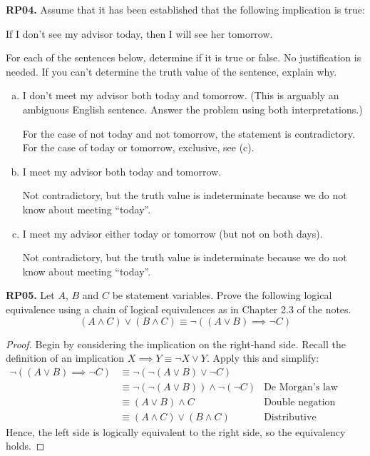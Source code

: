 \documentclass[11pt]{article}
\begin{document}
\textbf{RP04.} Assume that it has been established that the following implication is true:
\begin{center}
  If I don’t see my advisor today, then I will see her tomorrow.
\end{center}
For each of the sentences below, determine if it is true or false. No justification is needed.
If you can’t determine the truth value of the sentence, explain why.
\begin{enumerate}[(a)]
  \item I don’t meet my advisor both today and tomorrow. (This is arguably an ambiguous English sentence. Answer the problem using both interpretations.)

        For the case of not today and not tomorrow, the statement is contradictory.
        For the case of today or tomorrow, exclusive, see (c).

  \item I meet my advisor both today and tomorrow.

        Not contradictory, but the truth value is indeterminate because we do not know about meeting ``today''.

  \item I meet my advisor either today or tomorrow (but not on both days).

        Not contradictory, but the truth value is indeterminate because we do not know about meeting ``today''.
\end{enumerate}


\textbf{RP05.} Let $A$, $B$ and $C$ be statement variables.
Prove the following logical equivalence using a chain of logical equivalences as in Chapter 2.3 of the notes.
\begin{equation*}
  (A \land C) \lor (B \land C) \equiv \lnot((A \lor B) \implies \lnot C)
\end{equation*}

\begin{proof}
  Begin by considering the implication on the right-hand side.
  Recall the definition of an implication $X \implies Y \equiv \lnot X \lor Y$.
  Apply this and simplify:
  \begin{align*}
    \lnot((A \lor B) \implies \lnot C) & \equiv \lnot(\lnot (A \lor B) \lor \lnot C)                                           \\
                                       & \equiv \lnot(\lnot (A \lor B)) \land \lnot(\lnot C) & \text{De Morgan's law}          \\
                                       & \equiv (A \lor B) \land C                           & \text{Double negation}          \\
                                       & \equiv (A \land C) \lor (B \land C)                 & \text{Distributive conjunction}
  \end{align*}
  Hence, the left side is logically equivalent to the right side, so the equivalency holds.
\end{proof}
\end{document}
